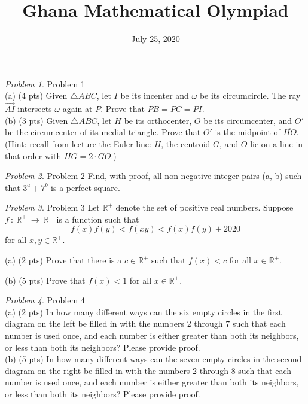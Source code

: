 \documentclass{article}
\title{Ghana Mathematical Olympiad}
\date{July 25, 2020}
\theoremstyle{remark}
\newtheorem{problem}{Problem}
\begin{document}
\maketitle

\begin{problem}
Problem 1
\\
(a) (4 pts) Given $\triangle ABC$, let $I$ be its incenter and $\omega$ be its circumcircle. The ray $\overrightarrow{AI}$ intersects $\omega$ again at $P$. Prove that $PB = PC = PI$.
\\
(b) (3 pts) Given $\triangle ABC$, let $H$ be its orthocenter, $O$ be its circumcenter, and $O'$ be the circumcenter of its medial triangle. Prove that $O'$ is the midpoint of $\overline{HO}$. (Hint: recall from lecture the Euler line: $H$, the centroid $G$, and $O$ lie on a line in that order with $HG = 2 \cdot GO$.)
\end{problem}

\bigskip


\begin{problem}
Problem 2 
Find, with proof, all non-negative integer pairs (a, b) such that $3^a+7^b$ is a perfect square.
\end{problem}

\bigskip
 
\begin{problem}
Problem 3
Let $\mathbb{R}^+$ denote the set of positive real numbers. Suppose $f~:~\mathbb{R}^+~\to~\mathbb{R}^+$ is a function such that $$f(x) f(y) < f(xy) < f(x)f(y) + 2020$$ for all $x,y \in \mathbb{R}^+$.

(a) (2 pts) Prove that there is a $c \in \mathbb{R}^+$ such that $f(x) < c$ for all $x \in \mathbb{R}^+$.

(b) (5 pts) Prove that $f(x) < 1$ for all $x \in \mathbb{R}^+$.
\end{problem}

\bigskip


\begin{problem}

Problem 4
\\
(a) (2 pts) In how many different ways can the six empty circles in the first diagram on the left be filled in with the numbers 2 through 7 such that each number is used once, and each number is either greater than both its neighbors, or less than both its neighbors? Please provide proof.\\

(b) (5 pts) In how many different ways can the seven empty circles in the second diagram on the right be filled in with the numbers 2 through 8 such that each number is used once, and each number is either greater than both its neighbors, or less than both its neighbors? Please provide proof.

\end{problem}
\end{document}

